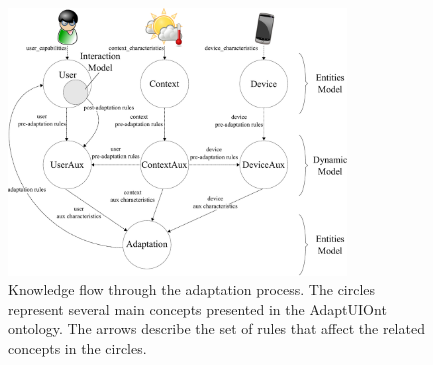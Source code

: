 \begin{figure}[H]
\centering
\includegraphics[width=0.80\textwidth]{flow_diagram.pdf}
\caption{Knowledge flow through the adaptation process. The circles represent 
several main concepts presented in the AdaptUIOnt ontology. The arrows describe 
the set of rules that affect the related concepts in the circles.}
\label{fig:flow_diagram}
\end{figure}



